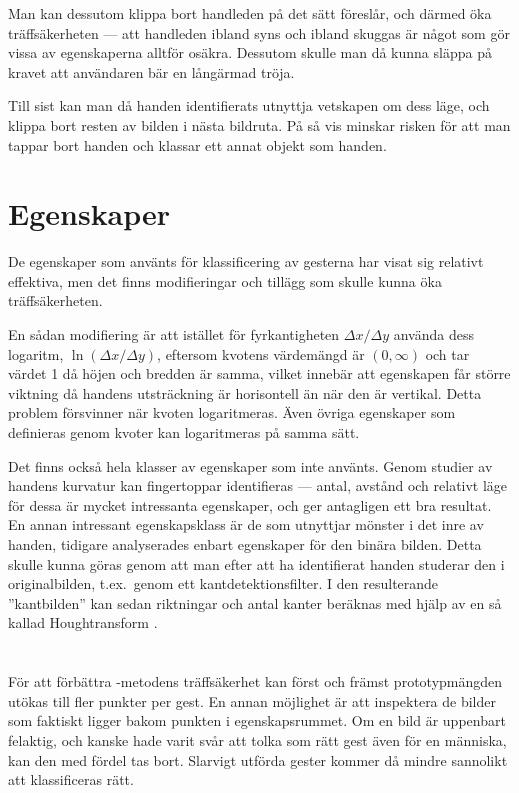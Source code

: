 \documentclass[../rapport_MVEX01-11-05]{subfiles}
\begin{document}
Man kan dessutom klippa bort handleden på det sätt
 föreslår, och därmed öka träffsäkerheten --- att
handleden ibland syns och ibland skuggas är något som gör vissa av 
egenskaperna alltför osäkra. Dessutom skulle man då kunna släppa på kravet
att användaren bär en långärmad tröja.

Till sist kan man då handen identifierats utnyttja
vetskapen om dess läge, och
klippa bort resten av bilden i nästa bildruta.
På så vis minskar risken för att man tappar bort handen och
klassar ett annat objekt som handen.

\section{Egenskaper}
De egenskaper som använts för klassificering av gesterna har visat sig relativt
effektiva, men det finns modifieringar och tillägg som skulle kunna
öka träffsäkerheten. 

En sådan modifiering är att istället för fyrkantigheten $\Delta
x/\Delta y$ använda dess logaritm, $\ln(\Delta x/\Delta
y)$, eftersom kvotens värdemängd är $(0,\infty)$ och tar värdet 1 då
höjen och bredden är samma, vilket innebär att egenskapen får större
viktning då handens utsträckning är horisontell än när den är vertikal. Detta problem
försvinner när kvoten logaritmeras. Även övriga egenskaper som
definieras genom kvoter kan logaritmeras på samma sätt.

Det finns också hela klasser av egenskaper som inte använts.
Genom studier av handens kurvatur kan fingertoppar 
identifieras --- antal, avstånd och relativt läge för dessa är
mycket intressanta egenskaper, och ger antagligen ett bra resultat.
En annan intressant egenskapsklass är de som utnyttjar mönster i det
inre av handen, tidigare analyserades enbart egenskaper för den binära bilden.
Detta skulle kunna göras
genom att man efter att ha identifierat handen studerar den
i originalbilden, t.ex.~genom ett kantdetektionsfilter.
I den resulterande ''kantbilden'' kan sedan riktningar och antal kanter
beräknas med hjälp av en så kallad Houghtransform \cite{Duda72}.

\section{\knn}
För att förbättra \knn-metodens träffsäkerhet kan först och
främst prototypmängden utökas till fler punkter per gest. En annan
möjlighet är att inspektera de bilder som faktiskt ligger bakom
punkten i egenskapsrummet. Om en bild är uppenbart felaktig, och kanske hade varit
svår att tolka som rätt gest även för en människa, kan den med fördel tas bort.
Slarvigt utförda gester kommer då mindre sannolikt att
klassificeras rätt.
\end{document}

